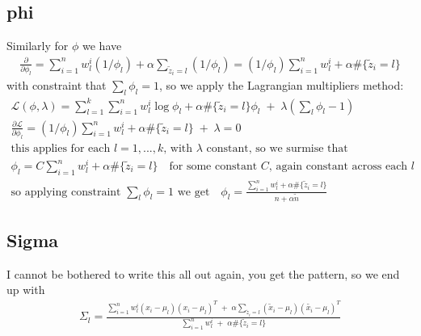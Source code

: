 \begin{answer}
\subsection*{phi}
Similarly for $\phi$ we have
\begin{align*}
\frac{\partial}{\partial \phi_l} = \sum_{i=1}^n w^i_l (1/\phi_l) + \alpha \sum_{\tilde{z}_i = l} (1/\phi_l) = (1/\phi_l) \sum_{i=1}^n w^i_l + \alpha \#\{\tilde{z}_i = l\}
\end{align*}
with constraint that $\sum_l \phi_l = 1$, so we apply the Lagrangian multipliers method:
\begin{align*}
\mathcal{L}(\phi, \lambda) = \sum_{l=1}^k \sum_{i=1}^n w^i_l \log \phi_l + \alpha \#\{\tilde{z}_i = l\} \phi_l \;+\; \lambda( \sum_l \phi_l - 1)
\\
\frac{\partial \mathcal{L}}{\partial \phi_l} = (1/\phi_l) \sum_{i=1}^n w^i_l + \alpha \#\{\tilde{z}_i = l\} \;+\; \lambda = 0
\\
\text{this applies for each $l=1,...,k$, with $\lambda$ constant, so we surmise that}
\\
\phi_l = C \sum_{i=1}^n w^i_l + \alpha \#\{\tilde{z}_i = l\} \quad \text{for some constant $C$, again constant across each $l$}
\\
\text{so applying constraint $\sum_l \phi_l = 1$ we get} \quad
\phi_l = \frac{\sum_{i=1}^n w^i_l + \alpha \#\{\tilde{z}_i = l\}}
{n + \alpha \tilde{n}}
\end{align*}


\subsection*{Sigma}
I cannot be bothered to write this all out again, you get the pattern, so we end up with 
\begin{align*}
\Sigma_l = 
\frac{
		\sum_{i=1}^n w^i_l (x_i - \mu_l)(x_i - \mu_l)^T \;+\;
		\alpha  \sum_{\tilde{z}_i = l} (\tilde{x}_i - \mu_l)(\tilde{x_i} -  \mu_l)^T
	}
	{
		\sum_{i=1}^n w^i_l \;+\;
		\alpha \#\{\tilde{z}_i = l\}
	}
\end{align*}
\end{answer}
%